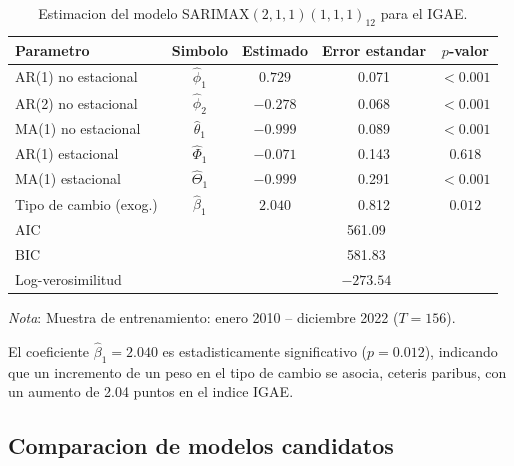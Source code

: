 \documentclass[12pt,a4paper]{article}
\begin{document}
\begin{table}[H]
  \centering
  \caption{Estimacion del modelo SARIMAX$(2,1,1)(1,1,1)_{12}$ para el IGAE.}
  \label{tab:resultados}
  \begin{tabular}{lcccc}
    \toprule
    \textbf{Parametro} & \textbf{Simbolo} & \textbf{Estimado} & \textbf{Error estandar} & \textbf{$p$-valor} \\
    \midrule
    AR(1) no estacional    & $\hat{\phi}_1$   &  $0.729$ & 0.071 & $<0.001$ \\
    AR(2) no estacional    & $\hat{\phi}_2$   & $-0.278$ & 0.068 & $<0.001$ \\
    MA(1) no estacional    & $\hat{\theta}_1$ & $-0.999$ & 0.089 & $<0.001$ \\
    AR(1) estacional       & $\hat{\Phi}_1$   & $-0.071$ & 0.143 &  $0.618$ \\
    MA(1) estacional       & $\hat{\Theta}_1$ & $-0.999$ & 0.291 & $<0.001$ \\
    Tipo de cambio (exog.) & $\hat{\beta}_1$  &  $2.040$ & 0.812 &  $0.012$ \\
    \midrule
    AIC               & & \multicolumn{3}{c}{561.09} \\
    BIC               & & \multicolumn{3}{c}{581.83} \\
    Log-verosimilitud & & \multicolumn{3}{c}{$-273.54$} \\
    \bottomrule
  \end{tabular}
  \begin{tablenotes}
    \small\item \textit{Nota}: Muestra de entrenamiento: enero 2010 -- diciembre 2022 ($T=156$).
  \end{tablenotes}
\end{table}

El coeficiente $\hat{\beta}_1 = 2.040$ es estadisticamente significativo ($p=0.012$), indicando que un incremento de un peso en el tipo de cambio se asocia, ceteris paribus, con un aumento de 2.04 puntos en el indice IGAE.

\subsection{Comparacion de modelos candidatos}
\end{document}
